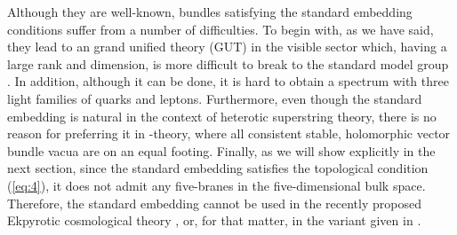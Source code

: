 \documentclass[a4paper,12pt]{article}
\numberwithin{equation}{section}
\theoremstyle{plain}
\begin{document}
Although they are well-known, bundles satisfying the standard embedding
conditions suffer from a number of difficulties. To begin with, as
we have said, they lead to an \coordHE{} grand unified theory (GUT) in the
visible sector which, having a large rank and dimension, is more difficult to 
break to the standard model group \coordHE{}.
In addition, although it can be done, it is hard to obtain a spectrum 
with three light families of 
quarks and leptons. Furthermore, even though the standard embedding is natural 
in the context of \coordHE{} heterotic superstring theory, there is
no reason for preferring it in \coordHE{}-theory, where all consistent stable, 
holomorphic vector bundle vacua are
on an equal footing. Finally, as we will show explicitly in the next section,
since the standard embedding satisfies the topological condition (\ref{eq:4}),
it does not admit any five-branes in the five-dimensional bulk space. Therefore,
the standard embedding cannot be used in the recently proposed Ekpyrotic 
cosmological theory \cite{EU}, or, for that matter, in the variant given in 
\cite{KKL}.
\end{document}
